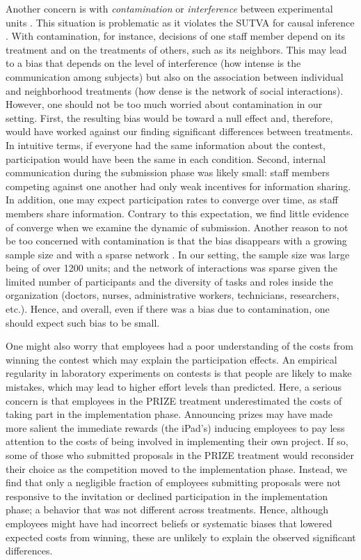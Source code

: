 \documentclass[11pt, titlepage]{article}
\begin{document}
Another concern is with \emph{contamination} or \emph{interference}
between experimental units \citep{rosenbaum2007interference}. This
situation is problematic as it violates the SUTVA for causal inference
\citep{rubin1974estimating}. With contamination, for instance, decisions
of one staff member depend on its treatment and on the treatments of
others, such as its neighbors. This may lead to a bias that depends on
the level of interference (how intense is the communication among
subjects) but also on the association between individual and
neighborhood treatments (how dense is the network of social
interactions). However, one should not be too much worried about
contamination in our setting. First, the resulting bias would be toward
a null effect and, therefore, would have worked against our finding
significant differences between treatments. In intuitive terms, if
everyone had the same information about the contest, participation would
have been the same in each condition. Second, internal communication
during the submission phase was likely small: staff members competing
against one another had only weak incentives for information sharing. In
addition, one may expect participation rates to converge over time, as
staff members share information. Contrary to this expectation, we find
little evidence of converge when we examine the dynamic of submission.
Another reason to not be too concerned with contamination is that the
bias disappears with a growing sample size and with a sparse network
\citep{forastiere2016identification}. In our setting, the sample size
was large being of over 1200 units; and the network of interactions was
sparse given the limited number of participants and the diversity of
tasks and roles inside the organization (doctors, nurses, administrative
workers, technicians, researchers, etc.). Hence, and overall, even if
there was a bias due to contamination, one should expect such bias to be
small.

One might also worry that employees had a poor understanding of the
costs from winning the contest which may explain the participation
effects. An empirical regularity in laboratory experiments on contests
\citep[see][]{dechenaux2014survey} is that people are likely to make
mistakes, which may lead to higher effort levels than predicted. Here, a
serious concern is that employees in the PRIZE treatment underestimated
the costs of taking part in the implementation phase. Announcing prizes
may have made more salient the immediate rewards (the iPad's) inducing
employees to pay less attention to the costs of being involved in
implementing their own project. If so, some of those who submitted
proposals in the PRIZE treatment would reconsider their choice as the
competition moved to the implementation phase. Instead, we find that
only a negligible fraction of employees submitting proposals were not
responsive to the invitation or declined participation in the
implementation phase; a behavior that was not different across
treatments. Hence, although employees might have had incorrect beliefs
or systematic biases that lowered expected costs from winning, these are
unlikely to explain the observed significant differences.
\end{document}
